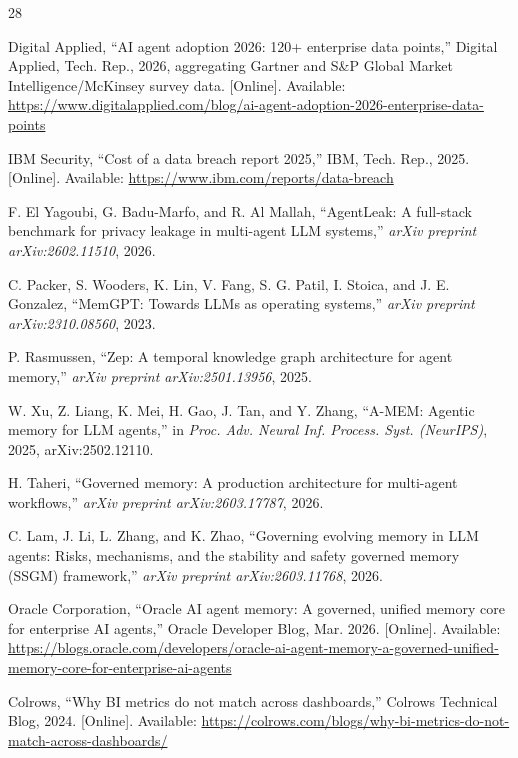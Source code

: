 \documentclass[nolineno]{ieeeaccess}
\begin{document}
\balance
\begin{thebibliography}{28}

Digital Applied, ``AI agent adoption 2026: 120+ enterprise data points,''
Digital Applied, Tech. Rep., 2026, aggregating Gartner and S\&P Global
Market Intelligence/McKinsey survey data. [Online]. Available:
\url{https://www.digitalapplied.com/blog/ai-agent-adoption-2026-enterprise-data-points}

IBM Security, ``Cost of a data breach report 2025,'' IBM, Tech. Rep., 2025.
[Online]. Available: \url{https://www.ibm.com/reports/data-breach}

F. El Yagoubi, G. Badu-Marfo, and R. Al Mallah, ``AgentLeak: A full-stack
benchmark for privacy leakage in multi-agent LLM systems,'' \emph{arXiv
preprint arXiv:2602.11510}, 2026.

C. Packer, S. Wooders, K. Lin, V. Fang, S. G. Patil, I. Stoica, and
J. E. Gonzalez, ``MemGPT: Towards LLMs as operating systems,''
\emph{arXiv preprint arXiv:2310.08560}, 2023.

P. Rasmussen, ``Zep: A temporal knowledge graph architecture for agent
memory,'' \emph{arXiv preprint arXiv:2501.13956}, 2025.

W. Xu, Z. Liang, K. Mei, H. Gao, J. Tan, and Y. Zhang, ``A-MEM: Agentic
memory for LLM agents,'' in \emph{Proc. Adv. Neural Inf. Process. Syst.
(NeurIPS)}, 2025, arXiv:2502.12110.

H. Taheri, ``Governed memory: A production architecture for multi-agent
workflows,'' \emph{arXiv preprint arXiv:2603.17787}, 2026.

C. Lam, J. Li, L. Zhang, and K. Zhao, ``Governing evolving memory in LLM
agents: Risks, mechanisms, and the stability and safety governed memory
(SSGM) framework,'' \emph{arXiv preprint arXiv:2603.11768}, 2026.

Oracle Corporation, ``Oracle AI agent memory: A governed, unified memory
core for enterprise AI agents,'' Oracle Developer Blog, Mar. 2026.
[Online]. Available:
\url{https://blogs.oracle.com/developers/oracle-ai-agent-memory-a-governed-unified-memory-core-for-enterprise-ai-agents}

Colrows, ``Why BI metrics do not match across dashboards,'' Colrows
Technical Blog, 2024. [Online]. Available:
\url{https://colrows.com/blogs/why-bi-metrics-do-not-match-across-dashboards/}


\end{thebibliography}
\end{document}
